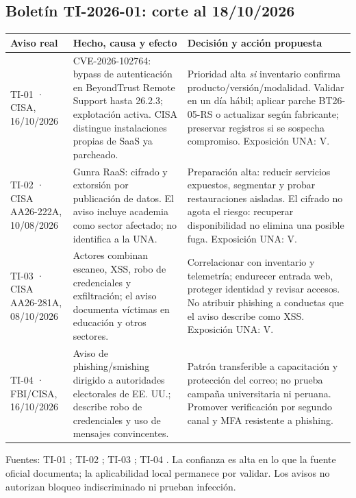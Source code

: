 \documentclass[10pt,a4paper]{article}
\newcommand{\cabecera}[1]{\textbf{#1}}
\begin{document}
\subsection{Boletín TI-2026-01: corte al 18/10/2026}
\begin{TablaCompacta}
\begin{longtable}{P{29mm}P{67mm}P{63mm}}
\toprule\cabecera{Aviso real} & \cabecera{Hecho, causa y efecto} & \cabecera{Decisión y acción propuesta}\\\midrule\endhead
TI-01 · CISA, 16/10/2026 & CVE-2026-102764: bypass de autenticación en BeyondTrust Remote Support hasta 26.2.3; explotación activa. CISA distingue instalaciones propias de SaaS ya parcheado. & Prioridad alta \emph{si} inventario confirma producto/versión/modalidad. Validar en un día hábil; aplicar parche BT26-05-RS o actualizar según fabricante; preservar registros si se sospecha compromiso. Exposición UNA: V.\\
TI-02 · CISA AA26-222A, 10/08/2026 & Gunra RaaS: cifrado y extorsión por publicación de datos. El aviso incluye academia como sector afectado; no identifica a la UNA. & Preparación alta: reducir servicios expuestos, segmentar y probar restauraciones aisladas. El cifrado no agota el riesgo: recuperar disponibilidad no elimina una posible fuga. Exposición UNA: V.\\
TI-03 · CISA AA26-281A, 08/10/2026 & Actores combinan escaneo, XSS, robo de credenciales y exfiltración; el aviso documenta víctimas en educación y otros sectores. & Correlacionar con inventario y telemetría; endurecer entrada web, proteger identidad y revisar accesos. No atribuir phishing a conductas que el aviso describe como XSS. Exposición UNA: V.\\
TI-04 · FBI/CISA, 16/10/2026 & Aviso de phishing/smishing dirigido a autoridades electorales de EE. UU.; describe robo de credenciales y uso de mensajes convincentes. & Patrón transferible a capacitación y protección del correo; no prueba campaña universitaria ni peruana. Promover verificación por segundo canal y MFA resistente a phishing.\\\bottomrule
\end{longtable}
\end{TablaCompacta}
Fuentes: TI-01 \cite{R19}; TI-02 \cite{R20}; TI-03 \cite{R18}; TI-04 \cite{R21}. La confianza es alta en lo que la fuente oficial documenta; la aplicabilidad local permanece por validar. Los avisos no autorizan bloqueo indiscriminado ni prueban infección.
\end{document}
